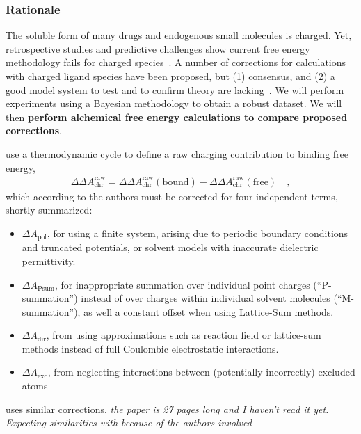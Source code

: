 \documentclass[10pt,final]{article}
\begin{document}
\subsubsection*{Rationale}
The soluble form of many drugs and endogenous small molecules is charged. Yet, retrospective studies and predictive challenges show current free energy methodology fails for charged species~\cite{Rocklin2013b,Muddana2014a}.
A number of corrections for calculations with charged ligand species have been proposed, but (1) consensus, and (2) a good model system to test and to confirm theory are lacking~\cite{Reif2013a,Rocklin2013a, Lin2014a}. We will perform experiments using a Bayesian methodology to obtain a robust dataset. We will then \textbf{ perform alchemical free energy calculations to compare proposed corrections}.

\textcite{Reif2013a} use a thermodynamic cycle to define a raw charging contribution to binding free energy,
\begin{align}
	\Delta\Delta A^\mathrm{raw}_\mathrm{chr} = \Delta\Delta A^\mathrm{raw}_\mathrm{chr}(\mathrm{bound}) - \Delta\Delta A^\mathrm{raw}_\mathrm{chr}(\mathrm{free}) \quad,
\end{align}
which according to the authors must be corrected for four independent terms, shortly summarized:
\begin{itemize}
  \item $\Delta A_\mathrm{pol}$, for using a finite system, arising due to periodic boundary conditions and truncated potentials, or solvent models with inaccurate dielectric permittivity.
  \item $\Delta A_\mathrm{Psum}$, for inappropriate summation over individual point charges (``P-summation'') instead of over charges within individual solvent molecules  (``M-summation''), as well a constant offset when using Lattice-Sum methods.~\cite{Kastenholz2006a}
  \item $\Delta A_\mathrm{dir}$, from using approximations such as reaction field or lattice-sum methods instead of full Coulombic electrostatic interactions.
  \item $\Delta A_\mathrm{exc}$, from neglecting interactions between (potentially incorrectly) excluded atoms 
\end{itemize}

\textcite{Rocklin2013a} uses similar corrections.
\emph{the paper is 27 pages long and I haven't read it yet. Expecting similarities with \textcite{Reif2013a} because of the authors involved}
\end{document}
